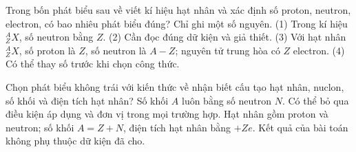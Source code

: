 \begin{ex}
Trong bốn phát biểu sau về viết kí hiệu hạt nhân và xác định số proton, neutron, electron, có bao nhiêu phát biểu đúng? Chỉ ghi một số nguyên. (1) Trong kí hiệu $^{A}_{Z}X$, số neutron bằng $Z$. (2) Cần đọc đúng dữ kiện và giả thiết. (3) Với hạt nhân $^{A}_{Z}X$, số proton là $Z$, số neutron là $A-Z$; nguyên tử trung hòa có $Z$ electron. (4) Có thể thay số trước khi chọn công thức.
\end{ex}

\begin{ex}
Chọn phát biểu không trái với kiến thức về nhận biết cấu tạo hạt nhân, nuclon, số khối và điện tích hạt nhân?
\choice
{Số khối $A$ luôn bằng số neutron $N$.}
{Có thể bỏ qua điều kiện áp dụng và đơn vị trong mọi trường hợp.}
{\True Hạt nhân gồm proton và neutron; số khối $A=Z+N$, điện tích hạt nhân bằng $+Ze$.}
{Kết quả của bài toán không phụ thuộc dữ kiện đã cho.}
\end{ex}

